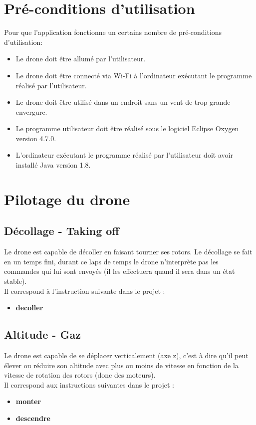 \documentclass{article}
\begin{document}
\section{Pré-conditions d'utilisation}
        Pour que l'application fonctionne un certains nombre de pré-conditions d'utilisation:
            \begin{itemize}
                \item Le drone doit être allumé par l'utilisateur.
                \item Le drone doit être connecté via Wi-Fi à l'ordinateur exécutant le programme réalisé par l'utilisateur.
                \item Le drone doit être utilisé dans un endroit sans un vent de trop grande envergure.
                \item Le programme utilisateur doit être réalisé sous le logiciel Eclipse Oxygen version 4.7.0.
                \item L'ordinateur exécutant le programme réalisé par l'utilisateur doit avoir installé Java version 1.8.
            \end{itemize}

\section{Pilotage du drone}
    \subsection{Décollage - Taking off}
        Le drone est capable de décoller en faisant tourner ses rotors. Le décollage se fait en un temps fini, durant ce laps de temps le drone n'interprète pas les commandes qui lui sont envoyés (il les effectuera quand il sera dans un état stable). \\
        Il correspond à l'instruction suivante dans le projet :
        \begin{itemize}
            \item \textbf{decoller}
        \end{itemize}
        
    \subsection{Altitude - Gaz}
        Le drone est capable de se déplacer verticalement (axe z), c'est à dire qu'il peut élever ou réduire son altitude avec plus ou moins de vitesse en fonction de la vitesse de rotation des rotors (donc des moteurs). \\
        Il correspond aux instructions suivantes dans le projet :
        \begin{itemize}
            \item \textbf{monter}
            \item \textbf{descendre}
        \end{itemize}
        
\end{document}
